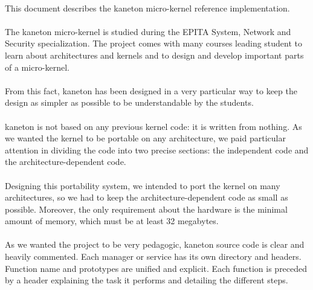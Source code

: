 \documentclass[12pt,a4wide]{report}
\newcommand{\kaneton}{kaneton\xspace}
\begin{document}
\newpage

\paragraph{}
This   document   describes   the  \kaneton   micro-kernel   reference
implementation.

\paragraph{}
The \kaneton micro-kernel is  studied during the EPITA System, Network
and  Security specialization.   The  project comes  with many  courses
leading student to learn about architectures and kernels and to design
and develop important parts of a micro-kernel.

\paragraph{}
From this fact, \kaneton has been designed in a very particular way to
keep the  design as  simpler as possible  to be understandable  by the
students.

\paragraph{}
\kaneton is not based on any previous kernel code: it is written from
nothing. As we  wanted the kernel to be  portable on any architecture,
we paid  particular attention  in dividing the  code into  two precise
sections: the independent code and the architecture-dependent code.

\paragraph{}
Designing this portability  system, we intended to port  the kernel on
many architectures, so we  had to keep the architecture-dependent code
as  small  as possible.   Moreover,  the  only  requirement about  the
hardware is  the minimal amount of  memory, which must be  at least 32
megabytes.

\paragraph{}
As we wanted the project to be very pedagogic, \kaneton source code is
clear  and heavily  commented. Each  manager  or service  has its  own
directory and  headers. Function name  and prototypes are  unified and
explicit. Each function is preceded by a header explaining the task it
performs and detailing the different steps.
\end{document}

